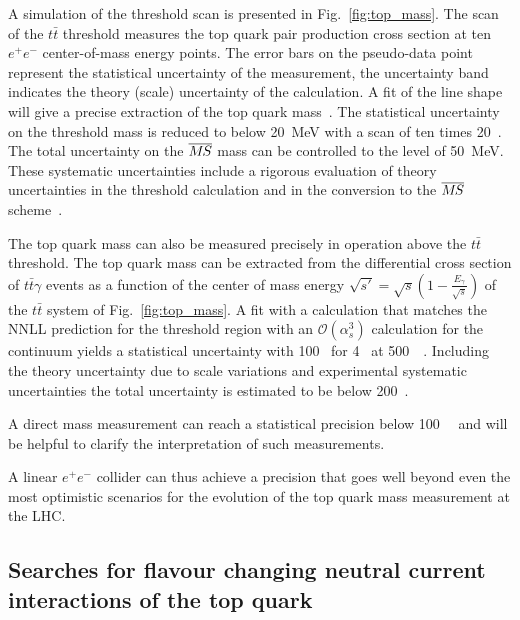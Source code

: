 A simulation of the threshold scan is presented in
Fig.~\ref{fig:top_mass}. The scan of the $t\bar t$ threshold measures the
top quark pair production cross section at ten $e^+e^-$ center-of-mass energy points. 
The error bars on the pseudo-data point represent the statistical uncertainty of
the measurement, the uncertainty band indicates the theory (scale) uncertainty 
of the calculation. A fit of the line shape will give
a precise extraction of the top quark mass~\cite{Martinez:2002st,Horiguchi:2013wra,Seidel:2013sqa}.
The statistical uncertainty on the threshold mass is reduced to 
below 20~MeV with a scan of ten times 20~\ifb. The total uncertainty 
on the $\msb$ mass can be controlled to the level
of 50~MeV. These systematic uncertainties
include a rigorous evaluation of theory uncertainties in the 
threshold calculation and in the conversion
to the $\msb$ scheme~\cite{Simon:2016pwp}.

The top quark mass can also be measured precisely in operation above the $t\bar t$
threshold. The top quark mass can be extracted from the differential cross section of $t\bar t \gamma$  events as a function of the center of mass energy 
$\sqrt{s'} = \sqrt{s} ( 1 - \frac{E_{\gamma}}{\sqrt{s}})$ 
of the $t \bar t$ system of Fig.~\ref{fig:top_mass}. A fit with a calculation that matches the 
NNLL prediction for the threshold region with an $\mathcal{O} (\alpha_{s}^3)$ calculation for 
the continuum yields a statistical uncertainty with 100~\MeV{} for 4~\iab{} at 500~\gev{}~\cite{Abramowicz:2018rjq}. Including the theory uncertainty due to scale variations
and experimental systematic uncertainties the total uncertainty is estimated to be below
200~\MeV. 

A direct mass 
measurement can reach a statistical precision below 100~\MeV{}~\cite{Seidel:2013sqa} and will 
be helpful to clarify the interpretation of such measurements.

A linear $e^+e^-$ collider
can thus achieve a precision that goes well beyond
even the most optimistic scenarios for the evolution 
of the top quark mass measurement at the LHC.

\subsection{Searches for flavour changing neutral current interactions of the top quark}
\label{subsec:top:fcnc}

